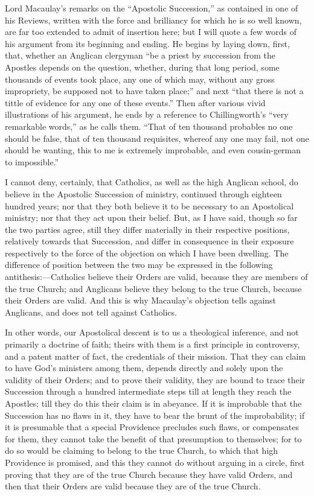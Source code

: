 Lord Macaulay's remarks on the ``Apostolic Succession,'' as
contained in one of his Reviews, written with the force and brilliancy
for which he is so well known, are far too extended to admit of
insertion here; but I will quote a few words of his argument from its
beginning and ending. He begins by laying down, first, that, whether
an Anglican clergyman ``be a priest by succession from the
Apostles depends on the question, whether, during that long period,
some thousands of events took place, any one of which may, without any
gross impropriety, be supposed not to have taken place;'' and next
``that there is not a tittle of evidence for any one of these
events.'' Then after various vivid illustrations of his argument,
he ends by a reference to Chillingworth's ``very remarkable
words,'' as he calls them. ``That of ten thousand probables no
one should be false, that of ten thousand requisites, whereof any one
may fail, not one should be wanting, this to me is extremely
improbable, and even cousin-german to impossible.''

I cannot deny, certainly, that Catholics, as well as the high
Anglican school, do believe in the Apostolic Succession of ministry,
continued through eighteen hundred years; nor that they both believe
it to be necessary to an Apostolical ministry; nor that they act upon
their belief. But, as I have said, though so far the two parties
agree, still they differ materially in their respective positions,
relatively towards that Succession, and differ in consequence in
their exposure respectively to the force of the objection on which I
have been dwelling. The difference of position between the two may be
expressed in the following antithesis:—Catholics believe their
Orders are valid, because they are members of the true Church; and
Anglicans believe they belong to the true Church, because their Orders
are valid. And this is why Macaulay's objection tells against
Anglicans, and does not tell against Catholics.

In other words, our Apostolical descent is to us a theological
inference, and not primarily a doctrine of faith; theirs with them is
a first principle in controversy, and a patent matter of fact, the
credentials of their mission. That they can claim to have God's
ministers among them, depends directly and solely upon the validity of
their Orders; and to prove their validity, they are bound to trace
their Succession through a hundred intermediate steps till at length
they reach the Apostles; till they do this their claim is in abeyance.
If it is improbable that the Succession has no flaws in it, they have
to bear the brunt of the improbability; if it is presumable that a
special Providence precludes such flaws, or compensates for them, they
cannot take the benefit of that presumption to themselves; for to do
so would be claiming to belong to the true Church, to which that high
Providence is promised, and this they cannot do without arguing in a
circle, first proving that they are of the true Church because they
have valid Orders, and then that their Orders are valid because they
are of the true Church.

